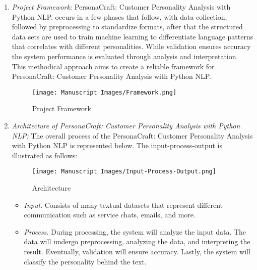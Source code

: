 \documentclass[conference]{IEEEtran}
\begin{document}
    \begin{enumerate}
        \item \textit{Project Framework:} PersonaCraft: Customer Personality Analysis with Python NLP.
            occurs in a few phases that follow, with data collection, followed by preprocessing to
            standardize formats, after that the structured data sets are used to train machine learning
            to differentiate language patterns that correlates with different personalities. While
            validation ensures accuracy the system performance is evaluated through analysis and
            interpretation. This methodical approach aims to create a reliable framework for PersonaCraft:
            Customer Personality Analysis with Python NLP.

            \begin{figure}[ht]
                \centering
                \texttt{[image: Manuscript Images/Framework.png]}
                \caption{Project Framework}
            \end{figure}

        \item \textit{Architecture of PersonaCraft: Customer Personality Analysis with Python NLP:}
            The overall process of the PersonaCraft: Customer Personality Analysis with Python NLP is
            represented below. The input-process-output is illustrated as follows:

            \begin{figure}[ht]
                \centering
                \texttt{[image: Manuscript Images/Input-Process-Output.png]}
                \caption{Architecture}
            \end{figure}

            \begin{itemize}
                \item \textit{Input}. Consists of many textual datasets that represent different communication
                    such as service chats, emails, and more.

                \item \textit{Process}. During processing, the system will analyze the input data. The
                    data will undergo preprocessing, analyzing the data, and interpreting the result.
                    Eventually, validation will ensure accuracy. Lastly, the system will classify the
                    personality behind the text.


\end{itemize}
\end{enumerate}
\end{document}
